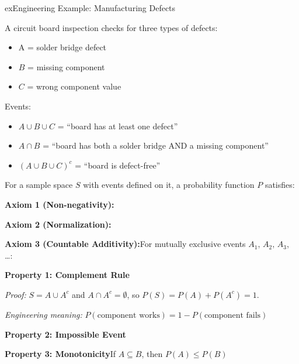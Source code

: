 \begin{PSbox}[unbreakable]{ex}{Engineering Example: Manufacturing Defects}

A circuit board inspection checks for three types of defects:

\begin{itemize}
\tightlist
\item
  A = solder bridge defect
\item
  $B$ = missing component
\item
  $C$ = wrong component value
\end{itemize}

Events:

\begin{itemize}
\tightlist
\item
  $A \cup B \cup C$ = ``board has at least one defect''
\item
  $A \cap B$ = ``board has both a solder bridge AND a missing component''
\item
  $(A \cup B \cup C)^{c}$ = ``board is defect-free''
\end{itemize}

\end{PSbox}



For a sample space $S$ with events defined on it, a probability function $P$ satisfies:

\textbf{Axiom 1 (Non-negativity):}

\textbf{Axiom 2 (Normalization):}

\textbf{Axiom 3 (Countable Additivity):}\PSbr{}For mutually exclusive events $A_{1},\, A_{2},\, A_{3}$, …:


\textbf{Property 1: Complement Rule}

\emph{Proof:} $S = A \cup A^{c}$ and $A \cap A^{c} = \emptyset$, so $P(S) = P(A) + P(A^{c}) = 1$.

\emph{Engineering meaning:} $P(\text{component works}) = 1 - P(\text{component fails})$

\textbf{Property 2: Impossible Event}

\textbf{Property 3: Monotonicity}\PSbr{}If $A \subseteq B$, then $P(A) \le P(B)$

